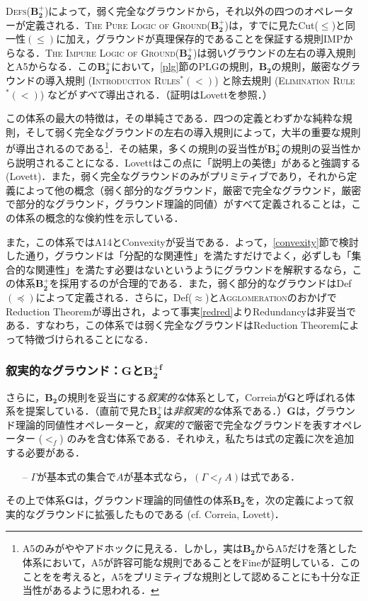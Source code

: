 \documentclass[twoside,14Q,dvipdfmx]{jsarticle}
\theoremstyle{definition}
\begin{document}
\textsc{Defs}($\mathbf{B_{2}^{+}}$)によって，弱く完全なグラウンドから，それ以外の四つのオペレーターが定義される．\textsc{The Pure Logic of Ground}($\mathbf{B_{2}^{+}}$)は，すでに見たCut($\leq$)と同一性$(\leq)$に加え，グラウンドが真理保存的であることを保証する規則IMPからなる．\textsc{The Impure Logic of Ground}($\mathbf{B_{2}^{+}}$)は弱いグラウンドの左右の導入規則とA5からなる．この$\mathbf{B_{2}^{+}}$において，\ref{plg}節の\textsc{PLG}の規則，$\mathbf{B_{2}}$の規則，厳密なグラウンドの導入規則 (\textsc{Introduciton Rules$^{*}(<)$}) と除去規則 (\textsc{Elimination Rule$^{*}(<)$}) などが\emph{すべて}導出される．（証明はLovett\cite{Lovett2020}を参照．）

この体系の最大の特徴は，その単純さである．四つの定義とわずかな純粋な規則，そして弱く完全なグラウンドの左右の導入規則によって，大半の重要な規則が導出されるのである\footnote{A5のみがややアドホックに見える．しかし，実は$\mathbf{B_{2}}$からA5だけを落とした体系において，A5が許容可能な規則であることをFine\cite{Fine2016}が証明している．このことをを考えると，A5をプリミティブな規則として認めることにも十分な正当性があるように思われる．}．その結果，多くの規則の妥当性が$\mathbf{B_{2}^{+}}$の規則の妥当性から説明されることになる．Lovettはこの点に「説明上の美徳」があると強調する (Lovett\cite[p.32]{Lovett2020})．また，弱く完全なグラウンドのみがプリミティブであり，それから定義によって他の概念（弱く部分的なグラウンド，厳密で完全なグラウンド，厳密で部分的なグラウンド，グラウンド理論的同値）がすべて定義されることは，この体系の概念的な倹約性を示している．

また，この体系ではA14とConvexityが妥当である．よって，\ref{convexity}節で検討した通り，グラウンドは「分配的な関連性」を満たすだけでよく，必ずしも「集合的な関連性」を満たす必要はないというようにグラウンドを解釈するなら，この体系$\mathbf{B_{2}^{+}}$を採用するのが合理的である．また，弱く部分的なグラウンドはDef$(\preceq)$によって定義される．さらに，Def($\approx$)と\textsc{Agglomeration}のおかげでReduction Theoremが導出され，よって事実\ref{redred}よりRedundancyは非妥当である．すなわち，この体系では弱く完全なグラウンドはReduction Theoremによって特徴づけられることになる．
%
%
%
\subsubsection{叙実的なグラウンド：$\mathbf{G}$と$\mathbf{B_{2}^{+f}}$}
さらに，$\mathbf{B_{2}}$の規則を妥当にする\emph{叙実的な}体系として，Correia\cite{Correia2010}が$\mathbf{G}$と呼ばれる体系を提案している．（直前で見た$\mathbf{B_{2}^{+}}$は\emph{非叙実的な}体系である．）$\mathbf{G}$は，グラウンド理論的同値性オペレーターと，\emph{叙実的で}厳密で完全なグラウンドを表すオペレーター ($<_{f}$) のみを含む体系である．それゆえ，私たちは式の定義に次を追加する必要がある．
	\begin{itemize}
	\item[--] $\Gamma$が基本式の集合で$A$が基本式なら，$(\Gamma<_{f}A)$は式である．
	\end{itemize}
その上で体系$\mathbf{G}$は，グラウンド理論的同値性の体系$\mathbf{B_{2}}$を，次の定義によって叙実的なグラウンドに拡張したものである (cf. Correia\cite{Correia2010}, Lovett\cite{Lovett2020})．
\end{document}
